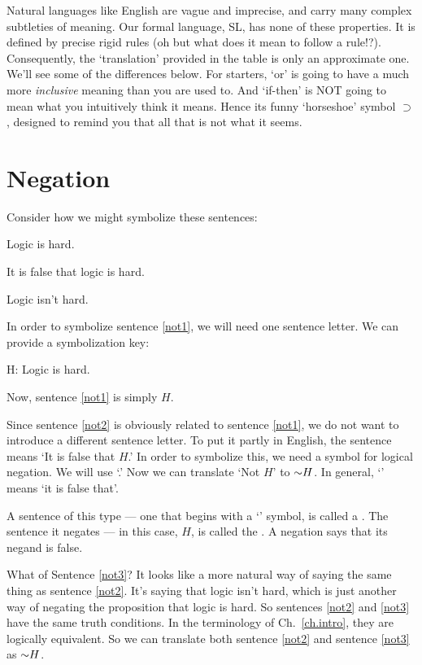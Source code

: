 Natural languages like English are vague and imprecise, and carry many complex subtleties of meaning. Our formal language, SL, has none of these properties. It is defined by precise rigid rules {\color{black}(oh but what does it mean to follow a rule!?)}. Consequently, the `translation' provided in the table is only an approximate one. We'll see some of the differences below. {\color{black}For starters, `or' is going to have a much more \textit{inclusive} meaning than you are used to. And `if-then' is NOT going to mean what you intuitively think it means. Hence its funny `horseshoe' symbol $\supset$, designed to remind you that all that is not what it seems.}

\section{Negation}
Consider how we might symbolize these sentences:
\begin{earg}
\item[\ex{not1}] Logic is hard.
\item[\ex{not2}] It is false that logic is hard.
\item[\ex{not3}] Logic isn't hard.
\end{earg}

In order to symbolize sentence \ref{not1}, we will need one sentence letter. We can provide a symbolization key:

\begin{ekey}
\item[H:]Logic is hard.
\end{ekey}

Now, sentence \ref{not1} is simply $H$. 

Since sentence \ref{not2} is obviously related to sentence \ref{not1}, we do not want to introduce a different sentence letter. To put it partly in English, the sentence means `It is false that $H$.' In order to symbolize this, we need a symbol for logical negation. We will use `\enot.' Now we can translate `Not $H$' to $\enot H$. In general, `\enot' means `it is false that'.

A sentence of this type --- one that begins with a `\enot' symbol, is called a . The sentence it negates --- in this case, $H$, is called the . A negation says that its negand is false.

What of Sentence \ref{not3}? It looks like a more natural  way of saying the same thing as sentence \ref{not2}. It's saying that logic isn't hard, which is just another way of negating the proposition that logic is hard. So sentences \ref{not2} and \ref{not3} have the same truth conditions. In the terminology of Ch.\ \ref{ch.intro}, they are logically equivalent.
So we can translate both sentence \ref{not2} and sentence \ref{not3} as $\enot H$.

